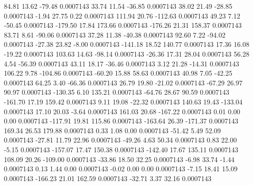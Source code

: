        84.81       13.62      -79.48     0.0007143
       33.74       11.54      -36.85     0.0007143
       38.02       21.49      -28.85     0.0007143
       -1.94       27.75        0.22     0.0007143
      111.94       20.76     -112.63     0.0007143
       49.23        7.12      -50.45     0.0007143
     -179.50       17.84      173.66     0.0007143
     -176.26       21.31      158.37     0.0007143
       83.71        8.61      -90.06     0.0007143
       37.28       11.38      -40.38     0.0007143
       92.60        7.22      -94.02     0.0007143
      -27.38       23.82       -8.00     0.0007143
     -141.18       18.52      140.77     0.0007143
       17.36       16.08      -19.22     0.0007143
      103.63       14.63      -98.14     0.0007143
      -26.36       17.31       28.04     0.0007143
       56.28        4.54      -56.39     0.0007143
       43.11       18.17      -36.46     0.0007143
        3.12       21.28      -14.31     0.0007143
      106.22        9.78     -104.86     0.0007143
      -60.20       15.88       58.63     0.0007143
       40.98        7.05      -42.25     0.0007143
       64.25        3.40      -66.36     0.0007143
       26.79       19.80      -21.02     0.0007143
      -67.29       26.97       90.97     0.0007143
     -130.35        6.10      135.21     0.0007143
      -64.76       28.67       90.59     0.0007143
     -161.70       17.19      159.42     0.0007143
        9.11       19.08      -22.32     0.0007143
      140.63       19.43     -133.04     0.0007143
       17.10       20.03       -3.64     0.0007143
      161.03       20.68     -167.22     0.0007143
        0.01        0.00        0.00     0.0007143
     -117.91       19.81      115.86     0.0007143
     -163.64       26.39     -171.37     0.0007143
      169.34       26.53      179.88     0.0007143
        0.33        1.08        0.00     0.0007143
      -51.42        5.49       52.09     0.0007143
      -27.81       11.79       22.96     0.0007143
      -49.26        4.63       50.34     0.0007143
        0.83       22.00       -5.15     0.0007143
     -157.07       17.47      150.38     0.0007143
     -142.40       17.67      135.11     0.0007143
      108.09       20.26     -109.00     0.0007143
      -33.86       18.50       32.25     0.0007143
       -6.98       33.74       -1.44     0.0007143
        0.13        1.44        0.00     0.0007143
       -0.02        0.00        0.00     0.0007143
       -7.15       18.41       15.09     0.0007143
     -166.23       21.01      162.59     0.0007143
      -32.71        3.37       32.16     0.0007143

